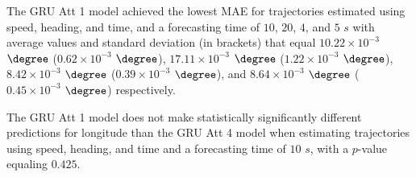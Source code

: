 \begin{table}[!ht]
	\centering
	\caption{The average MAE in $\degree$ ($\times 10^{-3}$), with standard deviation in brackets, across k-fold validation datasets for the trajectories in the k-fold testing datasets estimated using speed, heading, and time, different RNN models, and forecasting times.}
	\label{tab:best_speed_actual_dir_MAE}
\end{table}

The GRU Att 1 model achieved the lowest MAE for trajectories estimated using speed, heading, and time, and a forecasting time of $10$, $20$, $4$, and $5$ $s$ with average values and standard deviation (in brackets) that equal $10.22 \times 10^{-3}$ $\degree$ ($0.62 \times 10^{-3}$ $\degree$), $17.11 \times 10^{-3}$ $\degree$ ($1.22 \times 10^{-3}$ $\degree$), $8.42 \times 10^{-3}$ $\degree$ ($0.39 \times 10^{-3}$ $\degree$), and $8.64 \times 10^{-3}$ $\degree$ ($0.45 \times 10^{-3}$ $\degree$) respectively.

The GRU Att 1 model does not make statistically significantly different predictions for longitude than the GRU Att 4 model when estimating trajectories using speed, heading, and time and a forecasting time of $10$ $s$, with a $p$-value equaling $0.425$.

